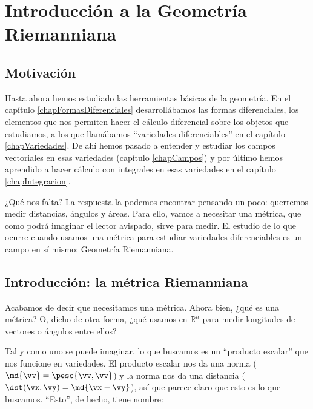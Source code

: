 \chapter{Introducción a la Geometría Riemanniana}
\label{chapGeometriaRiemman}

\section{Motivación}

Hasta ahora hemos estudiado las herramientas básicas de la geometría. En el capítulo \ref{chapFormasDiferenciales} desarrollábamos las formas diferenciales, los elementos que nos permiten hacer el cálculo diferencial sobre los objetos que estudiamos, a los que llamábamos ``variedades diferenciables'' en el capítulo \ref{chapVariedades}. De ahí hemos pasado a entender y estudiar los campos vectoriales en esas variedades (capítulo \ref{chapCampos}) y por último hemos aprendido a hacer cálculo con integrales en esas variedades en el capítulo \ref{chapIntegracion}.

¿Qué nos falta? La respuesta la podemos encontrar pensando un poco: querremos medir distancias, ángulos y áreas. Para ello, vamos a necesitar una métrica, que como podrá imaginar el lector avispado, sirve para medir. El estudio de lo que ocurre cuando usamos una métrica para estudiar variedades diferenciables es un campo en sí mismo: Geometría Riemanniana.

\section{Introducción: la métrica Riemanniana}

Acabamos de decir que necesitamos una métrica. Ahora bien, ¿qué es una métrica? O, dicho de otra forma, ¿qué usamos en $ℝ^n$ para medir longitudes de vectores o ángulos entre ellos?

Tal y como uno se puede imaginar, lo que buscamos es un ``producto escalar'' que nos funcione en variedades. El producto escalar nos da una norma ($\md{\vv} = \pesc{\vv, \vv}$) y la norma nos da una distancia ($\dst(\vx, \vy) = \md{\vx - \vy}$), así que parece claro que esto es lo que buscamos. ``Esto'', de hecho, tiene nombre:

